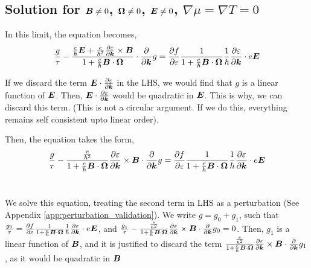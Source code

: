 \documentclass{report}
\renewcommand\vec[1]{\ensuremath\boldsymbol{#1}} %
\begin{document}
\subsection{Solution for $\vec{B}\neq0$, $\vec{\Omega}\neq 0$, $\vec{E} \neq 0$, $\nabla \mu = \nabla T = 0$}

In this limit, the equation becomes,
$$
\frac{g}{\tau} -\frac{\frac{e}{\hbar} \vec{E} +\frac{e}{\hbar^2} \frac{\partial \varepsilon}{\partial \vec{k}} \times \vec{B}}{1 + \frac{e}{\hbar} \vec{B} \cdot \vec{\Omega}} \cdot\frac{\partial}{\partial \vec{k}} g = \frac{\partial f}{\partial \varepsilon}\frac{1}{1 + \frac{e}{\hbar} \vec{B}\cdot \vec{\Omega}}
\frac{1}{\hbar} \frac{\partial \varepsilon}{\partial \vec{k}}\cdot e \vec{E} $$

If we discard the term $\vec{E} \cdot \frac{\partial \varepsilon}{\partial \vec{k}}$ in the LHS, we would find that $g$ is a linear function of $\vec{E}$. Then, $\vec{E} \cdot \frac{\partial \varepsilon}{\partial \vec{k}}$ would be quadratic in $\vec{E}$. This is why, we can discard this term. (This is not a circular argument. If we do this, everything remains self consistent upto linear order).

Then, the equation takes the form,
\begin{equation}
\frac{g}{\tau} -\frac{\frac{e}{\hbar^2} }{1 + \frac{e}{\hbar} \vec{B} \cdot \vec{\Omega}} \frac{\partial \varepsilon}{\partial \vec{k}} \times \vec{B} \cdot\frac{\partial}{\partial \vec{k}} g = \frac{\partial f}{\partial \varepsilon}\frac{1}{1 + \frac{e}{\hbar} \vec{B}\cdot \vec{\Omega}}
\frac{1}{\hbar} \frac{\partial \varepsilon}{\partial \vec{k}}\cdot e \vec{E}
\end{equation}~\label{Eq:BTE_zero_chem_pot_thermal_gradient}

We solve this equation, treating the second term in LHS as a perturbation (See Appendix \ref{app:perturbation_validation}).
We write $g = g_0 + g_1$, such that $\frac{g_0}{\tau} = \frac{\partial f}{\partial \varepsilon}\frac{1}{1 + \frac{e}{\hbar} \vec{B}\cdot\vec{\Omega}}
\frac{1}{\hbar} \frac{\partial \varepsilon}{\partial \vec{k}}\cdot e \vec{E}$, and $\frac{g_1}{\tau} -\frac{\frac{e}{\hbar^2} }{1 + \frac{e}{\hbar} \vec{B}\cdot\vec{\Omega}} \frac{\partial \varepsilon}{\partial \vec{k}} \times \vec{B} \cdot\frac{\partial}{\partial \vec{k}} g_0 = 0$.
Then, $g_1$ is a linear function of $\vec{B}$, and it is justified to discard the term $\frac{\frac{e}{\hbar^2} }{1 + \frac{e}{\hbar} \vec{B}\cdot\vec{\Omega}} \frac{\partial \varepsilon}{\partial \vec{k}} \times \vec{B} \cdot\frac{\partial}{\partial \vec{k}} g_1$, as it would be quadratic in $\vec{B}$
\end{document}
